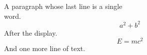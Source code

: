 \documentclass{article}
\begin{document}
A paragraph whose last line is a single\\
word.
\[ a^2+b^2 \]
After the display.
\begin{equation} E = mc^2 \end{equation}
And one more line of text.
\end{document}
